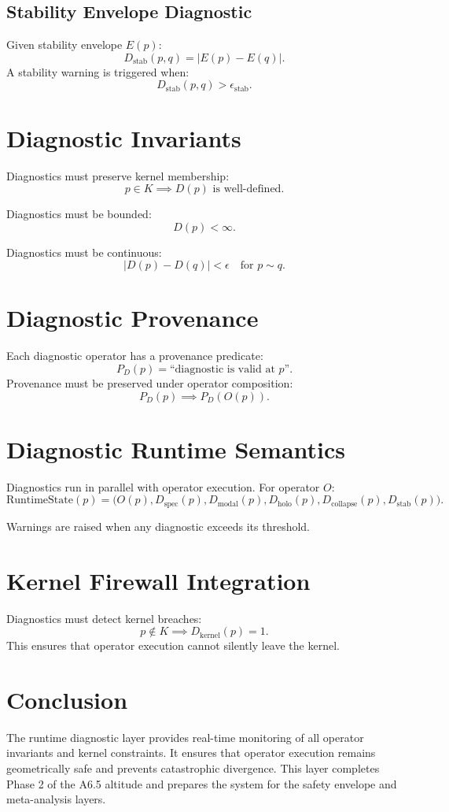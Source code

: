 \documentclass[11pt]{article}
\begin{document}
\subsection{Stability Envelope Diagnostic}
Given stability envelope $E(p)$:
\[
D_{\text{stab}}(p,q) = |E(p) - E(q)|.
\]
A stability warning is triggered when:
\[
D_{\text{stab}}(p,q) > \epsilon_{\text{stab}}.
\]

\section{Diagnostic Invariants}
Diagnostics must preserve kernel membership:
\[
p \in K \implies D(p) \text{ is well-defined}.
\]

Diagnostics must be bounded:
\[
D(p) < \infty.
\]

Diagnostics must be continuous:
\[
|D(p) - D(q)| < \epsilon \quad \text{for } p \sim q.
\]

\section{Diagnostic Provenance}
Each diagnostic operator has a provenance predicate:
\[
P_D(p) = \text{``diagnostic is valid at } p\text{''}.
\]
Provenance must be preserved under operator composition:
\[
P_D(p) \implies P_D(O(p)).
\]

\section{Diagnostic Runtime Semantics}
Diagnostics run in parallel with operator execution. For operator $O$:
\[
\text{RuntimeState}(p) =
\big( O(p), D_{\text{spec}}(p), D_{\text{modal}}(p),
      D_{\text{holo}}(p), D_{\text{collapse}}(p),
      D_{\text{stab}}(p) \big).
\]

Warnings are raised when any diagnostic exceeds its threshold.

\section{Kernel Firewall Integration}
Diagnostics must detect kernel breaches:
\[
p \notin K \implies D_{\text{kernel}}(p) = 1.
\]
This ensures that operator execution cannot silently leave the kernel.

\section*{Conclusion}
The runtime diagnostic layer provides real-time monitoring of all operator
invariants and kernel constraints. It ensures that operator execution remains
geometrically safe and prevents catastrophic divergence. This layer completes
Phase 2 of the A6.5 altitude and prepares the system for the safety envelope and
meta-analysis layers.
\end{document}
